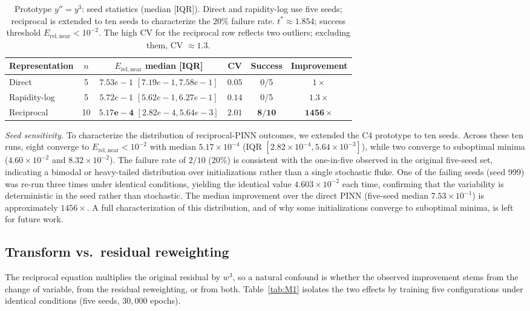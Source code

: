\documentclass[a4paper, 10pt]{article}
\theoremstyle{definition}
\begin{document}
\begin{table}[t]
\centering
\caption{Prototype $y''=y^3$: seed statistics (median [IQR]). Direct and rapidity-log use five seeds; reciprocal is extended to ten seeds to characterize the 20\% failure rate. $t^*\approx 1.854$; success threshold $E_{\mathrm{rel,near}}<10^{-2}$. The high CV for the reciprocal row reflects two outliers; excluding them, CV $\approx 1.3$.}
\label{tab:proto}
\begin{tabular}{lccccc}
\toprule
Representation & $n$ & $E_{\mathrm{rel,near}}$ median [IQR] & CV & Success & Improvement \\
\midrule
Direct         & 5 & $7.53e-1$ $[7.19e-1, 7.58e-1]$ & $0.05$ & 0/5 & $1\times$ \\
Rapidity-log   & 5 & $5.72e-1$ $[5.62e-1, 6.27e-1]$ & $0.14$ & 0/5 & $1.3\times$ \\
Reciprocal     & 10 & $\mathbf{5.17e-4}$ $[2.82e-4, 5.64e-3]$ & $\mathbf{2.01}$ & $\mathbf{8/10}$ & $\mathbf{1456\times}$ \\
\bottomrule
\end{tabular}
\end{table}

\emph{Seed sensitivity.} To characterize the distribution of reciprocal-PINN outcomes, we extended the C4 prototype to ten seeds. Across these ten runs, eight converge to $E_{\mathrm{rel,near}} < 10^{-2}$ with median $5.17\times 10^{-4}$ (IQR $[2.82\times 10^{-4}, 5.64\times 10^{-3}]$), while two converge to suboptimal minima ($4.60\times 10^{-2}$ and $8.32\times 10^{-2}$). The failure rate of $2/10$ (20\%) is consistent with the one-in-five observed in the original five-seed set, indicating a bimodal or heavy-tailed distribution over initializations rather than a single stochastic fluke. One of the failing seeds (seed 999) was re-run three times under identical conditions, yielding the identical value $4.603\times 10^{-2}$ each time, confirming that the variability is deterministic in the seed rather than stochastic. The median improvement over the direct PINN (five-seed median $7.53\times 10^{-1}$) is approximately $1456\times$. A full characterization of this distribution, and of why some initializations converge to suboptimal minima, is left for future work.

\subsection{Transform vs.\ residual reweighting}
\label{sec:M1}

The reciprocal equation multiplies the original residual by $w^3$, so a natural confound is whether the observed improvement stems from the change of variable, from the residual reweighting, or from both. Table~\ref{tab:M1} isolates the two effects by training five configurations under identical conditions (five seeds, $30{,}000$ epochs).
\end{document}
